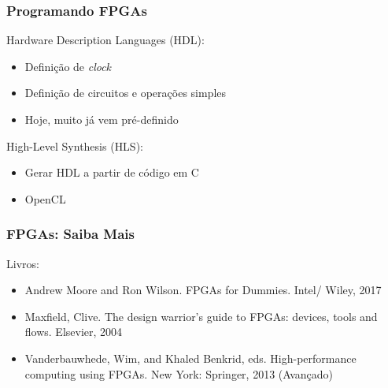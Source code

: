 \documentclass[10pt, compress, aspectratio=169, xcolor={table,usenames,dvipsnames}]{beamer}
\begin{document}
\begin{frame}
    \frametitle{Programando FPGAs}
    Hardware Description Languages (\alert{HDL}):
    \begin{itemize}
        \item Definição de \textit{clock}
        \item Definição de circuitos e operações simples
        \item Hoje, muito já vem pré-definido
    \end{itemize}

    High-Level Synthesis (\alert{HLS}):
    \begin{itemize}
        \item Gerar HDL a partir de \alert{código em C}
        \item \alert{OpenCL}
    \end{itemize}
\end{frame}

\begin{frame}
    \frametitle{FPGAs: Saiba Mais}
    Livros:

    \begin{itemize}
        \item Andrew Moore and Ron Wilson. FPGAs for Dummies. Intel/ Wiley, 2017
        \item Maxfield, Clive. The design warrior's guide to FPGAs: devices, tools and flows. Elsevier, 2004
        \item Vanderbauwhede, Wim, and Khaled Benkrid, eds. High-performance computing using FPGAs. New York: Springer, 2013 (Avançado)
    \end{itemize}
\end{frame}
\end{document}
